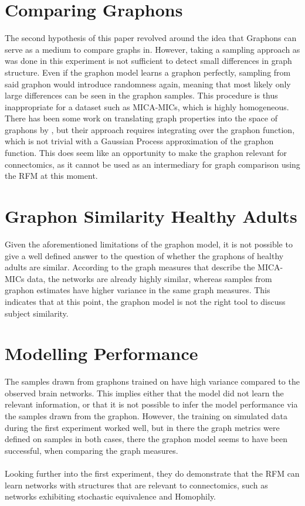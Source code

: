 \documentclass[11pt]{report} %
\begin{document}
\section{Comparing Graphons}
The second hypothesis of this paper revolved around the idea that Graphons can serve as a medium to compare graphs in. However, taking a sampling approach as was done in this experiment is not sufficient to detect small differences in graph structure. Even if the graphon model learns a graphon perfectly, sampling from said graphon would introduce randomness again, meaning that most likely only large differences can be seen in the graphon samples. This procedure is thus inappropriate for a dataset such as MICA-MICs, which is highly homogeneous. There has been some work on translating graph properties into the space of graphons by , but their approach requires integrating over the graphon function, which is not trivial with a Gaussian Process approximation of the graphon function. This does seem like an opportunity to make the graphon relevant for connectomics, as it cannot be used as an intermediary for graph comparison using the RFM at this moment.
\section{Graphon Similarity Healthy Adults}
Given the aforementioned limitations of the graphon model, it is not possible to give a well defined answer to the question of whether the graphons of healthy adults are similar. According to the graph measures that describe the MICA-MICs data, the networks are already highly similar, whereas samples from graphon estimates have higher variance in the same graph measures. This indicates that at this point, the graphon model is not the right tool to discuss subject similarity.
\section{Modelling Performance}
The samples drawn from graphons trained on have high variance compared to the observed brain networks. This implies either that the model did not learn the relevant information, or that it is not possible to infer the model performance via the samples drawn from the graphon. However, the training on simulated data during the first experiment worked well, but in there the graph metrics were defined on samples in both cases, there the graphon model seems to have been successful, when comparing the graph measures.\\\\
Looking further into the first experiment, they do demonstrate that the RFM can learn networks with structures that are relevant to connectomics, such as networks exhibiting stochastic equivalence and Homophily.
\end{document}
